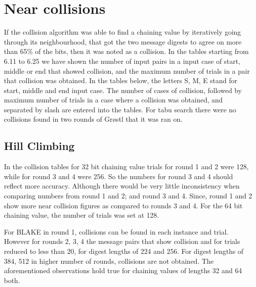 \section{Near collisions}

If the collision algorithm was able to find a chaining value by iteratively going through its neighbourhood, that got
the two message digests to agree on more than 65\% of the bits, then it was noted as a collision. In the tables
starting from 6.11 to 6.25 we have shown the number of input pairs in a input case of start, middle or end that
showed collision, and the maximum number of trials in a pair that collision was obtained. In the tables below, the
letters S, M, E stand for start, middle and end input case. The number of cases of collision, followed by maximum number
of trials in a case where a collision was obtained, and separated by slash are entered into the tables. For tabu search
there were no collisions found in two rounds of Gr{\o}stl that it was ran on.

\subsection{Hill Climbing}

In the collision tables for 32 bit chaining value trials for round 1 and 2 were 128, while for round 3 and 4 were 256.
So the numbers for round 3 and 4 should reflect more accuracy. Although there would be very little inconsistency
when comparing numbers from round 1 and 2; and round 3 and 4. Since, round 1 and 2 show more near collision figures
as compared to rounds 3 and 4. For the 64 bit chaining value, the number of trials was set at 128.

For BLAKE in round 1, collisions can be found in each instance and trial. However for rounds 2, 3, 4 the message pairs
that show collision and for trials reduced to less than 20, for digest lengths of 224 and 256. For digest lengths of
384, 512 in higher number of rounds, collisions are not obtained. The aforementioned observations hold true for
chaining values of lengths 32 and 64 both.

